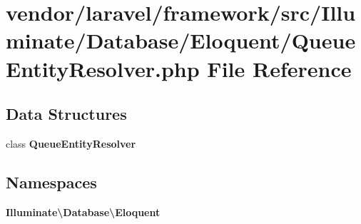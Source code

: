 \section{vendor/laravel/framework/src/\+Illuminate/\+Database/\+Eloquent/\+Queue\+Entity\+Resolver.php File Reference}
\label{_queue_entity_resolver_8php}
\subsection*{Data Structures}
\begin{DoxyCompactItemize}
\item 
class {\bf Queue\+Entity\+Resolver}
\end{DoxyCompactItemize}
\subsection*{Namespaces}
\begin{DoxyCompactItemize}
\item 
 {\bf Illuminate\textbackslash{}\+Database\textbackslash{}\+Eloquent}
\end{DoxyCompactItemize}

